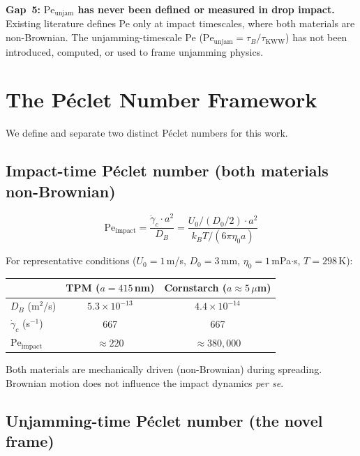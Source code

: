 \documentclass[11pt,letterpaper]{article}
\newcommand{\taukww}{\tau_{\mathrm{KWW}}}
\newcommand{\taub}{\tau_{B}}
\newcommand{\peunj}{\mathrm{Pe}_{\mathrm{unjam}}}
\newcommand{\peimp}{\mathrm{Pe}_{\mathrm{impact}}}
\newcommand{\gamcrit}{\dot{\gamma}_c}
\newcommand{\DB}{D_B}
\newcommand{\gap}[1]{\textbf{\color{gapborder}Gap~#1:}}
\begin{document}
\begin{gapbox}
\gap{5} \textbf{$\peunj$ has never been defined or measured in drop impact.}
Existing literature defines Pe only at impact timescales, where both materials
are non-Brownian. The unjamming-timescale Pe ($\peunj = \taub / \taukww$)
has not been introduced, computed, or used to frame unjamming physics.
\end{gapbox}

\section{The Péclet Number Framework}

We define and separate two distinct Péclet numbers for this work.

\subsection{Impact-time Péclet number (both materials non-Brownian)}

\begin{equation}
  \peimp = \frac{\gamcrit \cdot a^2}{\DB}
  = \frac{U_0/(D_0/2)\cdot a^2}{k_B T/(6\pi\eta_0 a)}
  \label{eq:Pe_impact}
\end{equation}

\noindent For representative conditions ($U_0 = 1$\,m/s, $D_0 = 3$\,mm,
$\eta_0 = 1$\,mPa$\cdot$s, $T = 298$\,K):

\begin{center}
\begin{tabular}{lcc}
  \toprule
  & TPM ($a = 415$\,nm) & Cornstarch ($a \approx 5\,\mu$m) \\
  \midrule
  $\DB$ (m$^2$/s) & $5.3\times10^{-13}$ & $4.4\times10^{-14}$ \\
  $\gamcrit$ (s$^{-1}$) & 667 & 667 \\
  $\peimp$ & $\approx 220$ & $\approx 380{,}000$ \\
  \bottomrule
\end{tabular}
\end{center}

Both materials are mechanically driven (non-Brownian) during spreading.
Brownian motion does not influence the impact dynamics \emph{per se}.

\subsection{Unjamming-time Péclet number (the novel frame)}
\end{document}
